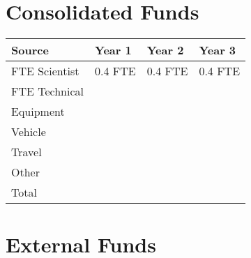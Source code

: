 \documentclass[version=last,
    paper=a4, %
    10pt, %
    usenames,
    dvipsnames,
    oneside, %
    headings=openany, %
    DIV=15 %
]{scrbook}
\begin{document}
\section*{Consolidated Funds }



\begin{longtabu} to \linewidth { |  X | X | X | X | }
\hline
{}
Source & Year 1 & Year 2 & Year 3\\
\hline
\endhead



FTE Scientist & 0.4 FTE & 0.4 FTE & 0.4 FTE\\



FTE Technical &  &  & \\



Equipment &  &  & \\



Vehicle &  &  & \\



Travel &  &  & \\



Other &  &  & \\



Total &  &  & \\


\hline
\end{longtabu}



\section*{External Funds }
\end{document}
